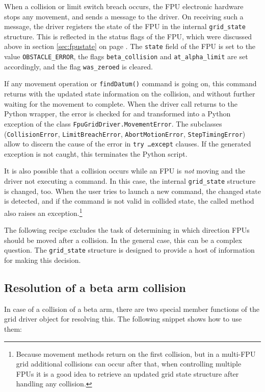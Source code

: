 \documentclass{scrartcl}[12pt,a4paper]
\begin{document}
When a collision or limit switch breach occurs, the FPU electronic
hardware stops any movement, and sends a message to the driver. On
receiving such a message, the driver registers the state of the FPU in
the internal \texttt{grid\_state} structure. This is reflected in the
status flags of the FPU, which were discussed above in section
\ref{sec:fpustate} on page \pageref{sec:fpustate}.  The \texttt{state}
field of the FPU is set to the value \texttt{OBSTACLE\_ERROR}, the
flags \texttt{beta\_collision} and \texttt{at\_alpha\_limit} are set
accordingly, and the flag \texttt{was\_zeroed} is cleared.

If any movement operation or \texttt{findDatum()} command is going on,
this command returns with the updated state information on the
collision, and without further waiting for the movement to complete.
When the driver call returns to the Python wrapper, the error is
checked for and transformed into a Python exception of the class
\texttt{FpuGridDriver.MovementError}. The subclasses
(\texttt{CollisionError}, \texttt{LimitBreachError},
\texttt{AbortMotionError}, \texttt{StepTimingError}) allow to discern
the cause of the error in \texttt{try \ldots except} clauses.  If the
generated exception is not caught, this terminates the Python script.

It is also possible that a collision occurs while an FPU is \emph{not}
moving and the driver not executing a command.  In this case, the
internal \texttt{grid\_state} structure is changed, too. When the user
tries to launch a new command, the changed state is detected, and if
the command is not valid in collided state, the called method also
raises an exception.\footnote{Because movement methods return on the
  first collision, but in a multi-FPU grid additional collisions can
  occur after that, when controlling multiple FPUs it is a good idea
  to retrieve an updated grid state structure after handling any
  collision.}

The following recipe excludes the task of determining in which
direction FPUs should be moved after a collision.  In the general
case, this can be a complex question. The \texttt{grid\_state}
structure is designed to provide a host of information for making this
decision.

\subsection{Resolution of a beta arm collision}

In case of a collision of a beta arm, there are two special member
functions of the grid driver object for resolving this. The following
snippet shows how to use them:
\end{document}
